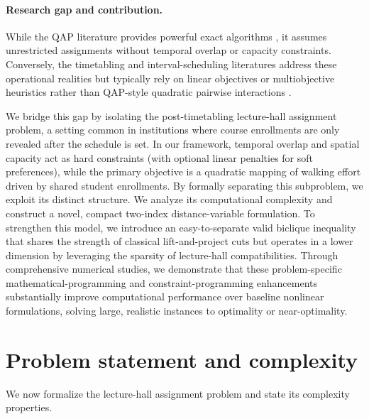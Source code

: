 \documentclass[11pt]{article}
\begin{document}
\paragraph{Research gap and contribution.}
While the QAP literature provides powerful exact algorithms \citep{kaufman1978,frieze1983,adams1994,hahn1998,zhao1998,anstreicher2002,anstreicher2003,burer2006,fischer2019}, it assumes unrestricted assignments without temporal overlap or capacity constraints. Conversely, the timetabling and interval-scheduling literatures address these operational realities but typically rely on linear objectives or multiobjective heuristics rather than QAP-style quadratic pairwise interactions \citep{carter1992,kolen2007,lewis2005,mccollum2010,bonutti2012,abdullah2012,rappos2022,davison2025,roomalloc2026}. 

We bridge this gap by isolating the post-timetabling lecture-hall assignment problem, a setting common in institutions where course enrollments are only revealed after the schedule is set. In our framework, temporal overlap and spatial capacity act as hard constraints (with optional linear penalties for soft preferences), while the primary objective is a quadratic mapping of walking effort driven by shared student enrollments. By formally separating this subproblem, we exploit its distinct structure. We analyze its computational complexity and construct a novel, compact two-index distance-variable formulation. To strengthen this model, we introduce an easy-to-separate valid biclique inequality that shares the strength of classical lift-and-project cuts but operates in a lower dimension by leveraging the sparsity of lecture-hall compatibilities. Through comprehensive numerical studies, we demonstrate that these problem-specific mathematical-programming and constraint-programming enhancements substantially improve computational performance over baseline nonlinear formulations, solving large, realistic instances to optimality or near-optimality.

\section{Problem statement and complexity}\label{sec:problem}
We now formalize the lecture-hall assignment problem and state its complexity properties.
\end{document}
